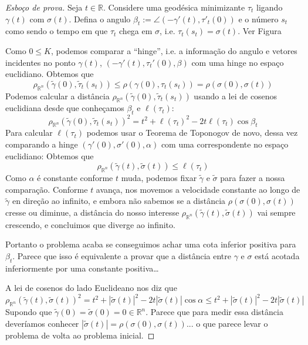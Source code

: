 \begin{proof}[Esboço de prova]
Seja $t \in \mathbb{R}$. Considere uma
geodésica minimizante $\tau_t$ ligando
$\gamma(t)$ com $\sigma(t)$. Defina o angulo
$\beta_t:=\angle(-\gamma'(t),\tau'_t(0))$ e o
número $s_t$ como sendo o tempo em que
$\tau_t$ chega em $\sigma$, i.e.
$\tau_t(s_t)=\sigma(t)$. Ver Figura

Como $0 \leq  K$, podemos comparar a
``hinge'',
i.e. a informação do angulo e vetores
incidentes no ponto $\gamma(t)$,
$(-\gamma'(t),\tau_t'(0),\beta)$ com uma
hinge no espaço
euclidiano. Obtemos que
$$
\rho_{\mathbb{R}^n}(\tilde{\gamma}(0),
\tilde{\tau}_t(s_t))\leq
\rho(\gamma(0),\tau_t(s_t))=\rho(\sigma(0),
\sigma(t))
$$
Podemos calcular a distância
$\rho_{\mathbb{R}^n}(\tilde{\gamma}(0),
\tilde{\tau}_t(s_t))$
usando a lei de
cosenos euclidiana desde que conheçamos
$\beta_t$ e $\ell(\tau_t)$:
$$
\rho_{\mathbb{R}^n}(\tilde{\gamma}(0),
\tilde{\tau}_t(s_t))^2=
t^2+\ell(\tau_t)^2-2t\ell(\tau_t)\cos \beta_t
$$
Para calcular $\ell(\tau_t)$ podemos usar o
Teorema de Toponogov de novo, dessa
vez comparando a hinge $(\gamma'(0),
\sigma'(0),\alpha)$ com uma correspondente
no espaço euclidiano:
Obtemos que
$$
\rho_{\mathbb{R}^n}(\tilde{\gamma}(t),
\tilde{\sigma}(t))\leq
\ell(\tau_t)
$$
Como $\alpha$ é constante conforme $t$ muda,
podemos fixar $\tilde{\gamma}$ e
$\tilde{\sigma}$ para fazer a nossa
comparação. Conforme  $t$ avança, nos
movemos a velocidade constante ao longo de
$\tilde{\gamma}$ en direção ao
infinito, e embora não sabemos se a distância
$\rho(\sigma(0),\sigma(t))$ cresse
 ou diminue, a distância do nosso interesse
$\rho_{\mathbb{R}^n}(\tilde{\gamma}(t),
\tilde{\sigma}(t))$
vai sempre crescendo, e concluimos que
diverge ao infinito.

Portanto o problema acaba se conseguimos
achar uma cota inferior positiva para
$\beta_t$. Parece que isso é equivalente a
provar que a distância entre
$\gamma$ e $\sigma$ está acotada
inferiormente por uma constante positiva…

A lei de cosenos do lado Euclideano nos diz
que
$$
\rho_{\mathbb{R}^n}(\tilde{\gamma}(t),
\tilde{\sigma}(t))^2=
t^2+|\tilde{\sigma}(t)|^2-2t
|\tilde{\sigma}(t)|\cos \alpha
\leq t^2+|\tilde{\sigma}(t)|^2-2t
|\tilde{\sigma}(t)|
$$
Supondo que
$\tilde{\gamma}(0)=\tilde{\sigma}(0)=0 \in
\mathbb{R}^n$.
Parece que para medir essa distância
deveríamos conhecer
$|\tilde{\sigma}(t)|=\rho(\sigma(0),\sigma(t)
)$...
 o que parece levar o problema de volta ao
problema inicial.
\end{proof}

